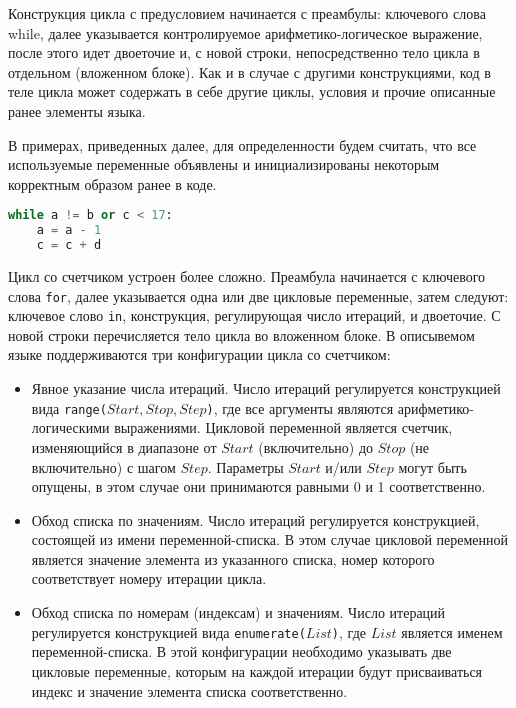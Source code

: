 Конструкция цикла с предусловием начинается с преамбулы: ключевого слова while, далее указывается контролируемое арифметико-логическое выражение, после этого идет двоеточие и, с новой строки, непосредственно тело цикла в отдельном (вложенном блоке).
Как и в случае с другими конструкциями, код в теле цикла может содержать в себе другие циклы, условия и прочие описанные ранее элементы языка.

В примерах, приведенных далее, для определенности будем считать, что все используемые переменные объявлены и инициализированы некоторым корректным образом ранее в коде.

\clearpage

\begin{lstlisting}[language=Python, caption=Пример цикла с предусловием]
while a != b or c < 17:
    a = a - 1
    c = c + d
\end{lstlisting}

Цикл со счетчиком устроен более сложно.
Преамбула начинается с ключевого слова \verb|for|, далее указывается одна или две цикловые переменные, затем следуют: ключевое слово \verb|in|, конструкция, регулирующая число итераций, и двоеточие.
С новой строки перечисляется тело цикла во вложенном блоке.
В описывемом языке поддерживаются три конфигурации цикла со счетчиком:

\begin{itemize}
    \item Явное указание числа итераций.
          Число итераций регулируется конструкцией вида \verb|range(|\(Start, Stop, Step\)\verb|)|, где все аргументы являются арифметико-логическими выражениями.
          Цикловой переменной является счетчик, изменяющийся в диапазоне от \(Start\) (включительно) до \(Stop\) (не включительно) с шагом \(Step\).
          Параметры \(Start\) и/или \(Step\) могут быть опущены, в этом случае они принимаются равными 0 и 1 соответственно.
    \item Обход списка по значениям.
          Число итераций регулируется конструкцией, состоящей из имени переменной-списка.
          В этом случае цикловой переменной является значение элемента из указанного списка, номер которого соответствует номеру итерации цикла.
    \item Обход списка по номерам (индексам) и значениям.
          Число итераций регулируется конструкцией вида \verb|enumerate(|\(List\)\verb|)|, где \(List\) является именем переменной-списка.
          В этой конфигурации необходимо указывать две цикловые переменные, которым на каждой итерации будут присваиваться индекс и значение элемента списка соответственно.
\end{itemize}

